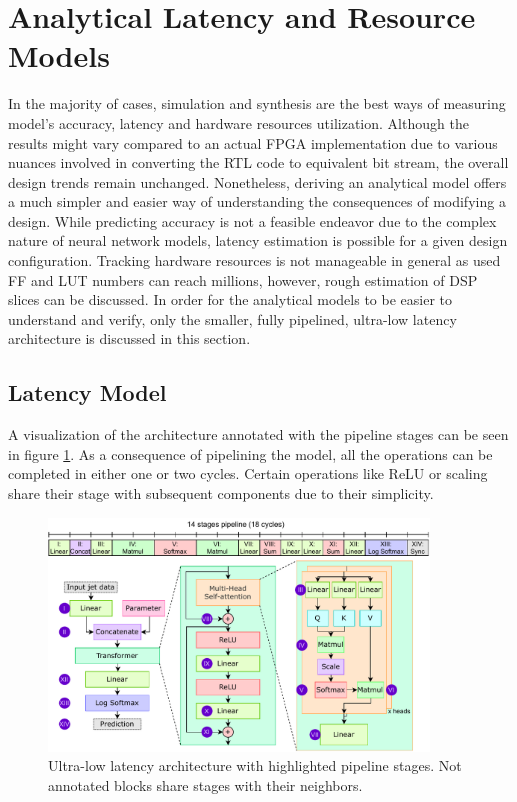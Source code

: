 \section{Analytical Latency and Resource Models}
In the majority of cases, simulation and synthesis are the best ways of measuring model's accuracy, latency and hardware resources utilization. Although the results might vary compared to an actual FPGA implementation due to various nuances involved in converting the RTL code to equivalent bit stream, the overall design trends remain unchanged. Nonetheless, deriving an analytical model offers a much simpler and easier way of understanding the consequences of modifying a design. While predicting accuracy is not a feasible endeavor due to the complex nature of neural network models, latency estimation is possible for a given design configuration. Tracking hardware resources is not manageable in general as used FF and LUT numbers can reach millions, however, rough estimation of DSP slices can be discussed. In order for the analytical models to be easier to understand and verify, only the smaller, fully pipelined, ultra-low latency architecture is discussed in this section.

\subsection{Latency Model}
A visualization of the architecture annotated with the pipeline stages can be seen in figure \ref{fig:pipeline-stages}. As a consequence of pipelining the model, all the operations can be completed in either one or two cycles. Certain operations like ReLU or scaling share their stage with subsequent components due to their simplicity.

\begin{figure}[hpt!]
  \centering
  \includegraphics[trim={0cm 0cm 0cm 0cm}, width=0.9\textwidth, center]{quantization/pipelining_stages.pdf}
  \caption{Ultra-low latency architecture with highlighted pipeline stages. Not annotated blocks share stages with their neighbors.}
  \label{fig:pipeline-stages}
\end{figure}

